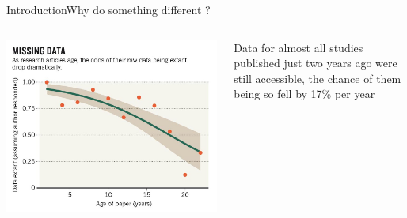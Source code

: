 \documentclass{eecslides}
\begin{document}
\begin{frame}{Introduction}{Why do something different ?}


\begin{columns}[c]
	\begin{column}{.50\paperwidth}
		\includegraphics[width=.50\paperwidth]{Nature_fig.jpg}
	\end{column}
	\begin{column}{.4\paperwidth}
		 Data for almost all studies published just two years ago were still accessible, the chance of them being so \alert{fell by 17\% per year} \citep{Vines2013}
	\end{column}
\end{columns}

\end{frame}

\end{document}
